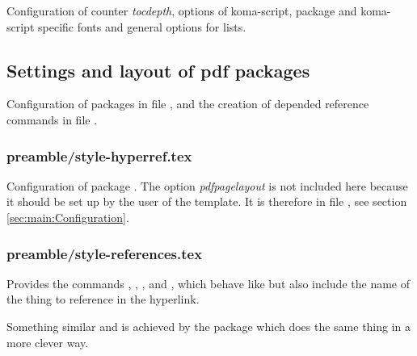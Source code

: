 Configuration of counter \emph{tocdepth}, options of koma-script, package  and koma-script specific fonts and general options for lists.


\subsection{Settings and layout of pdf packages}

Configuration of packages  in file ,  and the creation of  depended reference commands in file .


\subsubsection{preamble/style-hyperref.tex}

Configuration of package . The option \emph{pdfpagelayout} is not included here because it should be set up by the user of the template. It is therefore in file , see section \vref{sec:main:Configuration}.


\subsubsection{preamble/style-references.tex}

Provides the commands , , ,  and , which behave like  but also include the name of the thing to reference in the hyperlink.

Something similar and is achieved by the package  which does the same thing in a more clever way.


